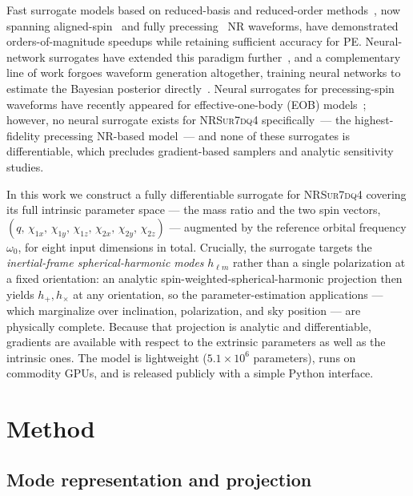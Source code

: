 \documentclass[aps,prd,twocolumn,superscriptaddress,longbibliography]{revtex4-2}
\newcommand{\NRSur}{\textsc{NRSur7dq4}}
\begin{document}
Fast surrogate models based on reduced-basis and reduced-order
methods~\cite{Field:2014,Blackman:2015,OShaughnessy:2017}, now spanning
aligned-spin~\cite{Varma:2018} and fully
precessing~\cite{Blackman:2017a,Blackman:2017b,Varma:2019csw}
NR waveforms, have demonstrated orders-of-magnitude speedups while
retaining sufficient accuracy for PE.
Neural-network surrogates have extended this paradigm further~\cite{Chua:2018woh,Khan:2020fso},
and a complementary line of
work forgoes waveform generation altogether, training neural networks to
estimate the Bayesian posterior
directly~\cite{George:2018,Gabbard:2019,Green:2020,Dax:2021tsq}.
Neural surrogates for precessing-spin waveforms have recently appeared
for effective-one-body (EOB) models~\cite{Thomas:2022,Whittall:2026};
however, no neural surrogate exists for \NRSur{} specifically~---
the highest-fidelity precessing NR-based model~---
and none of these surrogates is differentiable, which precludes
gradient-based samplers and analytic sensitivity studies.

In this work we construct a fully differentiable surrogate for
\NRSur{} covering its full intrinsic parameter space --- the mass ratio
and the two spin vectors, $(q,\,\chi_{1x},\,\chi_{1y},\,\chi_{1z},
\,\chi_{2x},\,\chi_{2y},\,\chi_{2z})$ --- augmented by the reference
orbital frequency $\omega_0$, for eight input dimensions in total.
Crucially, the surrogate targets the \emph{inertial-frame
spherical-harmonic modes} $h_{\ell m}$ rather than a single polarization
at a fixed orientation: an analytic spin-weighted-spherical-harmonic
projection then yields $h_+,h_\times$ at any orientation, so the
parameter-estimation applications --- which marginalize over inclination,
polarization, and sky position --- are physically complete.
Because that projection is analytic and differentiable, gradients are
available with respect to the extrinsic parameters as well as the intrinsic
ones. The model is lightweight ($5.1\times 10^6$ parameters),
runs on commodity GPUs, and is released publicly
with a simple Python interface.

\section{Method}
\label{sec:method}

\subsection{Mode representation and projection}
\label{sec:modes}
\end{document}
